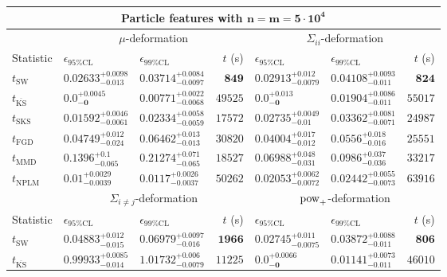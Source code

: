 \begin{tabular}{l|llr|llr}
	\toprule
	\multicolumn{7}{c}{{\bf Particle features with $\mathbf{n=m=5\cdot 10^{4}}$}} \\
	\toprule
	\multicolumn{1}{c}{} & \multicolumn{3}{c}{$\mu$-deformation} & \multicolumn{3}{c}{$\Sigma_{ii}$-deformation} \\
	Statistic & $\epsilon_{95\%\mathrm{CL}}$ & $\epsilon_{99\%\mathrm    {CL}}$ & $t$ (s) & $\epsilon_{95\%\mathrm{CL}}$ & $\epsilon_{99\%\mathrm{CL}}$ & $t$ (s) \\
	\midrule
	$t_{\mathrm{SW}}$ & $0.02633_{-0.013}^{+0.0098}$ & $0.03714_{-0.0097}^{+0.0084}$ & ${\mathbf{849}}$ & $0.02913_{-0.0079}^{+0.012}$ & $0.04108_{-0.011}^{+0.0093}$ & ${\mathbf{824}}$ \\
	$t_{\overline{\mathrm{KS}}}$ & ${\mathbf{0.0_{-0}^{+0.0045}}}$ & ${\mathbf{0.00771_{-0.0068}^{+0.0022}}}$ & $49525$ & ${\mathbf{0.0_{-0}^{+0.013}}}$ & ${\mathbf{0.01904_{-0.011}^{+0.0086}}}$ & $55017$ \\
	$t_{\mathrm{SKS}}$ & $0.01592_{-0.0061}^{+0.0046}$ & $0.02334_{-0.0059}^{+0.0058}$ & $17572$ & $0.02735_{-0.01}^{+0.0049}$ & $0.03362_{-0.0071}^{+0.0081}$ & $24987$ \\
	$t_{\mathrm{FGD}}$ & $0.04749_{-0.024}^{+0.012}$ & $0.06462_{-0.013}^{+0.013}$ & $30820$ & $0.04004_{-0.012}^{+0.017}$ & $0.0556_{-0.016}^{+0.018}$ & $25551$ \\
	$t_{\mathrm{MMD}}$ & $0.1396_{-0.065}^{+0.1}$ & $0.21274_{-0.065}^{+0.071}$ & $18527$ & $0.06988_{-0.031}^{+0.048}$ & $0.0986_{-0.036}^{+0.037}$ & $33217$ \\
\rowcolor{red!35}	$t_{\mathrm{NPLM}}$ & $0.01_{-0.0039}^{+0.0029}$ & $0.0117_{-0.0037}^{+0.0026}$ & $50262$ & $0.02053_{-0.0072}^{+0.0062}$ & $0.02442_{-0.0073}^{+0.0055}$ & $63916$ \\
	\toprule
	\multicolumn{1}{c}{} & \multicolumn{3}{c}{$\Sigma_{i\neq j}$-deformation} & \multicolumn{3}{c}{$\rm{pow}_{+}$-deformation} \\
Statistic & $\epsilon_{95\%\mathrm{CL}}$ & $\epsilon_{99\%\mathrm{CL}}$ & $t$ (s) & $\epsilon_{95\%\mathrm{CL}}$ & $\epsilon_{99\%\mathrm{CL}}$ & $t$ (s) \\
	\midrule
	$t_{\mathrm{SW}}$ & $0.04883_{-0.015}^{+0.012}$ & $0.06979_{-0.016}^{+0.0097}$ & ${\mathbf{1966}}$ & $0.02745_{-0.0075}^{+0.011}$ & $0.03872_{-0.011}^{+0.0088}$ & ${\mathbf{806}}$ \\
	$t_{\overline{\mathrm{KS}}}$ & $0.99933_{-0.014}^{+0.0085}$ & $1.01732_{-0.0079}^{+0.006}$ & $11225$ & ${\mathbf{0.0_{-0}^{+0.0066}}}$ & ${\mathbf{0.01141_{-0.011}^{+0.0073}}}$ & $46010$ \\

\end{tabular}

